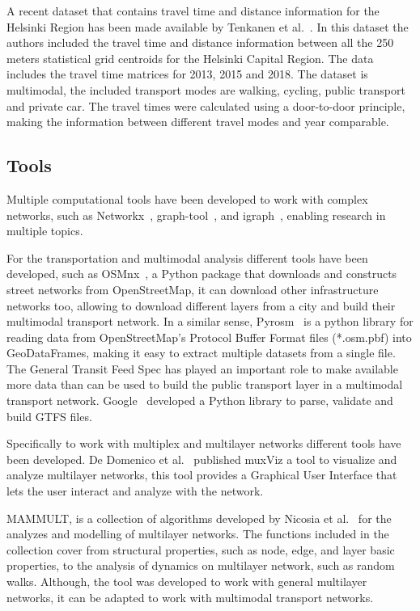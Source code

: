 A recent dataset that contains travel time and distance information for the Helsinki Region has been made available by Tenkanen et al.~\cite{tenkanen2020travel}. In this dataset the authors included the travel time and distance information between all the 250 meters statistical grid centroids for the Helsinki Capital Region. The data includes the travel time matrices for 2013, 2015 and 2018. The dataset is multimodal, the included transport modes are walking, cycling, public transport and private car. The travel times were calculated using a door-to-door principle, making the information between different travel modes and year comparable.

\subsection{Tools}

Multiple computational tools have been developed to work with complex networks, such as Networkx~\cite{hagberg2008networkx}, graph-tool~\cite{peixoto2020graphtool}, and igraph~\cite{csardi2006igraph}, enabling research in multiple topics. 

For the transportation and multimodal analysis different tools have been developed, such as OSMnx~\cite{boeing2017osmnx}, a Python package that downloads and constructs street networks from OpenStreetMap, it can download other infrastructure networks too, allowing to download different layers from a city and build their multimodal transport network. In a similar sense, Pyrosm~\cite{tenkanen2020pyrosm} is a python library for reading data from OpenStreetMap's Protocol Buffer Format files (*.osm.pbf) into GeoDataFrames, making it easy to extract multiple datasets from a single file. The General Transit Feed Spec has played an important role to make available more data than can be used to build the public transport layer in a multimodal transport network. Google~\cite{google2020gtfs} developed a Python library to parse, validate and build GTFS files.

Specifically to work with multiplex and multilayer networks different tools have been developed. De Domenico et al.~\cite{dedomenico2015muxviz} published muxViz a tool to visualize and analyze multilayer networks, this tool provides a Graphical User Interface that lets the user interact and analyze with the network.

MAMMULT, is a collection of algorithms developed by Nicosia et al.~\cite{nicosia2015mammult} for the analyzes and modelling of multilayer networks. The functions included in the collection cover from structural properties, such as node, edge, and layer basic properties, to the analysis of dynamics on multilayer network, such as random walks. Although, the tool was developed to work with general multilayer networks, it can be adapted to work with multimodal transport networks.

